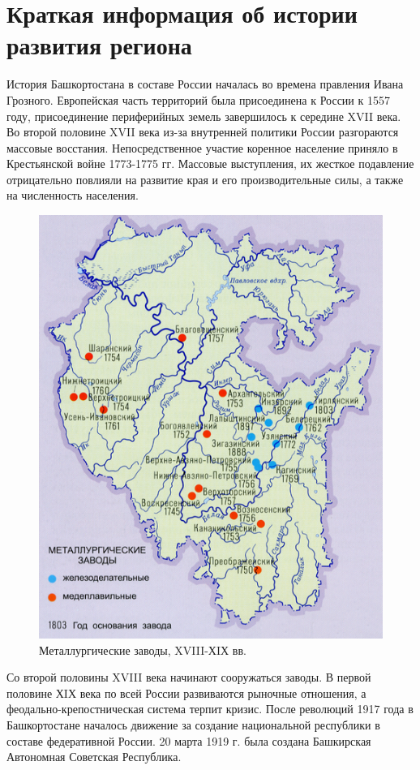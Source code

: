\section{Краткая информация об истории развития региона}

История Башкортостана в составе России началась во времена правления Ивана Грозного. Европейская часть территорий была присоединена к России к 1557 году, присоединение периферийных земель завершилось к середине XVII века. Во второй половине XVII века из-за внутренней политики России разгораются массовые восстания. Непосредственное участие коренное население приняло в Крестьянской войне 1773-1775 гг. Массовые выступления, их жесткое подавление отрицательно повлияли на развитие края и его производительные силы, а также на численность населения. 

\begin{figure}
\includegraphics[width=1\linewidth]{pics/sasha/factories_18-19} 
\caption{Металлургические заводы, XVIII-ХIХ вв.}
\end{figure}
Со второй половины XVIII века начинают сооружаться заводы. В первой половине ХIХ века по всей России развиваются рыночные отношения, а феодально-крепостническая система терпит кризис. После революций 1917 года в Башкортостане началось движение за создание национальной республики в составе федеративной России. 20 марта 1919 г. была создана Башкирская Автономная Советская Республика. 

